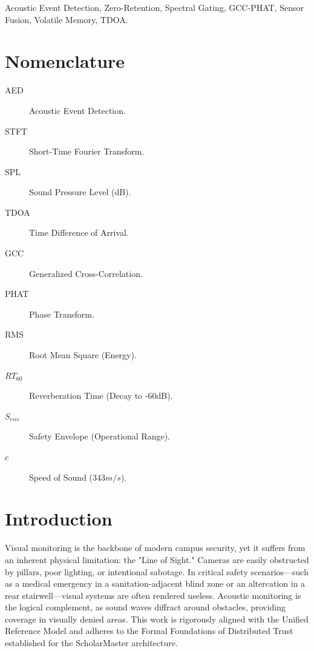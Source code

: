 \documentclass[conference]{IEEEtran}
\begin{document}
\begin{IEEEkeywords}
Acoustic Event Detection, Zero-Retention, Spectral Gating, GCC-PHAT, Sensor Fusion, Volatile Memory, TDOA.
\end{IEEEkeywords}

\section*{Nomenclature}
\begin{description}
    \item[AED] Acoustic Event Detection.
    \item[STFT] Short-Time Fourier Transform.
    \item[SPL] Sound Pressure Level (dB).
    \item[TDOA] Time Difference of Arrival.
    \item[GCC] Generalized Cross-Correlation.
    \item[PHAT] Phase Transform.
    \item[RMS] Root Mean Square (Energy).
    \item[$RT_{60}$] Reverberation Time (Decay to -60dB).
    \item[$S_{env}$] Safety Envelope (Operational Range).
    \item[$c$] Speed of Sound ($343 m/s$).
\end{description}

\section{Introduction}
Visual monitoring is the backbone of modern campus security, yet it suffers from an inherent physical limitation: the "Line of Sight." Cameras are easily obstructed by pillars, poor lighting, or intentional sabotage. In critical safety scenarios—such as a medical emergency in a sanitation-adjacent blind zone or an altercation in a rear stairwell—visual systems are often rendered useless. Acoustic monitoring is the logical complement, as sound waves diffract around obstacles, providing coverage in visually denied areas. This work is rigorously aligned with the Unified Reference Model \cite{P20} and adheres to the Formal Foundations of Distributed Trust \cite{P21} established for the ScholarMaster architecture.
\end{document}
